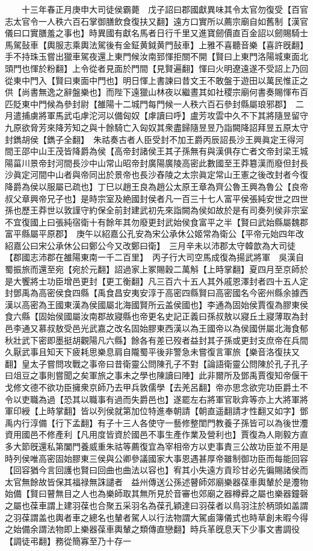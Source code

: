 　　十三年春正月庚申大司徒侯霸薨　戊子詔曰郡國獻異味其令太官勿復受【百官志太官令一人秩六百石掌御膳飲食復扶又翻】遠方口實所以薦宗廟自如舊制【漢官儀曰口實膳羞之事也】時異國有獻名馬者日行千里又進寶劒價直百金詔以劒賜騎士馬駕鼔車【輿服志乘輿法駕後有金鉦黄鉞黄門鼔車】上雅不喜聽音樂【喜許旣翻】手不持珠玉嘗出獵車駕夜還上東門候汝南郅惲拒關不開【賢曰上東門洛陽城東面北頭門也惲於粉翻】上令從者見面於門間【見賢遍翻】惲曰火明遼遠遂不受詔上乃回從東中門入【賢曰東面中門也】明日惲上書諫曰昔文王不敢盤于遊田以萬民惟正之供【尚書無逸之辭盤樂也】而陛下遠獵山林夜以繼晝其如社稷宗廟何書奏賜惲布百匹貶東中門候為參封尉【雒陽十二城門每門候一人秩六百石參封縣屬琅邪郡】　二月遣捕虜將軍馬武屯虖沱河以備匈奴【虖讀曰呼】盧芳攻雲中久不下其將隨昱留守九原欲脅芳來降芳知之與十餘騎亡入匈奴其衆盡歸隨昱昱乃詣闕降詔拜昱五原太守封鐫胡侯【鐫子全翻】　朱祜奏古者人臣受封不加王爵丙辰詔長沙王興眞定王得河間王邵中山王茂皆降爵為侯【高帝封諸侯王其子孫無有與漢俱存亡者文帝封梁王城陽菑川景帝封河間長沙中山常山昭帝封廣陽廣陵高密此數國至王莽簒漢而廢但封長沙眞定河間中山者與帝同出於景帝也長沙舂陵之太宗眞定常山王憲之後改封者今復降爵為侯以服屬已疏也】丁巳以趙王良為趙公太原王章為齊公魯王興為魯公【良帝叔父章興帝兄子也】是時宗室及絶國封侯者凡一百三十七人富平侯張純安世之四世孫也歷王莽世以敦謹守約保全前封建武初先來詣闕為侯如故於是有司奏列侯非宗室不宜復國上曰張純宿衛十有餘年其勿廢更封武始侯食富平之半【賢曰武始縣屬魏郡富平縣屬平原郡】　庚午以紹嘉公孔安為宋公承休公姬常為衛公【平帝元始四年改紹嘉公曰宋公承休公曰鄭公今又改鄭曰衛】　三月辛未以沛郡太守韓歆為大司徒【郡國志沛郡在雒陽東南一千二百里】　丙子行大司空馬成復為揚武將軍　吳漢自蜀振旅而還至宛【宛於元翻】詔過家上冢賜穀二萬斛【上時掌翻】夏四月至京師於是大饗將士功臣增邑更封【更工衡翻】凡三百六十五人其外戚恩澤封者四十五人定封鄧禹為高密侯食四縣【禹食昌安夷安淳于高密四縣賢曰高密國名今密州縣余據西漢以高密為王國東漢為侯國屬北海國賢所云盖侯國也】李通為固始侯賈復為膠東侯食六縣【固始侯國屬汝南郡故寢縣也帝更名史記正義曰孫叔敖以寢丘土寢薄取為封邑李通又慕叔敖受邑光武嘉之改名固始膠東西漢以為王國帝以為侯國併屬北海食郁秋壯武下密即墨挺胡觀陽凡六縣】餘各有差已歿者益封其子孫或更封支庶帝在兵間久厭武事且知天下疲耗思樂息肩自隴蜀平後非警急未嘗復言軍旅【樂音洛復扶又翻】皇太子嘗問攻戰之事帝曰昔衛靈公問陳孔子不對【論語衛靈公問陳於孔子孔子曰俎豆之事則嘗聞之矣軍旅之事未之學也陳讀曰陣】此非爾所及鄧禹賈復知帝偃干戈修文德不欲功臣擁衆京師乃去甲兵敦儒學【去羌呂翻】帝亦思念欲完功臣爵土不令以吏職為過【恐其以職事有過而失爵邑也】遂罷左右將軍官耿弇等亦上大將軍將軍印綬【上時掌翻】皆以列侯就第加位特進奉朝請【朝直遥翻請才性翻又如字】鄧禹内行淳備【行下孟翻】有子十三人各使守一藝修整閨門教養子孫皆可以為後世灋資用國邑不修產利【凡用度皆資於國邑不事生產作業及營利也】賈復為人剛毅方直多大節旣還私第闔門養威重朱祜等薦復宜為宰相帝方以吏事責三公故功臣並不用是時列侯唯高密固始膠東三侯與公卿參議國家大事恩遇甚厚帝雖制御功臣而每能回容【回容猶今言回護也賢曰回曲也曲法以容也】宥其小失遠方貢珍甘必先徧賜諸侯而太官無餘故皆保其福禄無誅譴者　益州傳送公孫述瞽師郊廟樂器葆車輿輦於是灋物始備【賢曰瞽無目之人也為樂師取其無所見於音審也郊廟之器樽彛之屬也樂器鐘磬之屬也葆車謂上建羽葆也合聚五采羽名為葆孔穎達曰羽葆者以鳥羽注於柄頭如盖謂之羽葆謂盖也輿者車之總名也輦者駕人以行法物謂大駕鹵簿儀式也時草創未暇今得之始備余謂法物即上樂器葆車輿輦之類傳直戀翻】時兵革旣息天下少事文書調役【調徒弔翻】務從簡寡至乃十存一
